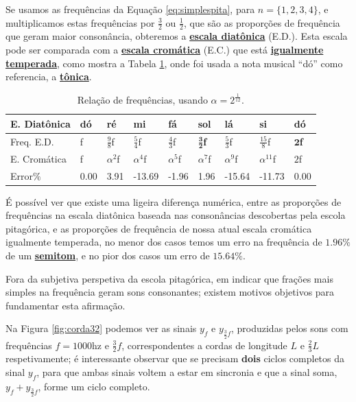Se usamos as frequências da Equação \ref{eq:simplespita}, para $n=\{1,2,3,4\}$,
e multiplicamos estas frequências por $\frac{3}{2}$ ou $\frac{1}{2}$, que
são as proporções de frequência que geram maior consonância,
obteremos a \hyperref[sec:pos:Diatonica]{\textbf{escala diatônica}} (E.D.).
Esta escala pode ser comparada com a \hyperref[sec:pos:Cromatica]{\textbf{escala cromática}} (E.C.)
que está \hyperref[subsec:tempigual]{\textbf{igualmente temperada}}, 
como mostra a Tabela \ref{tab:pitagorascromatica}, onde foi usada a nota musical ``dó'' como referencia, a \hyperref[sec:Tonica]{\textbf{tônica}}.
\begin{table}[h]
  \centering
  \begin{tabular}{|l|l|l|l|l|l|l|l|l|}
  \hline
  E. Diatônica  & dó & ré & mi & fá & sol & lá & si & dó \\ \hline
  \hline
  Freq. E.D.  & f  & $\frac{9}{8}$f & $\frac{5}{4}$f & $\frac{4}{3}$f & $\mathbf{\frac{3}{2}}$\textbf{f} & $\frac{5}{3}$f & $\frac{15}{8}$f & $\mathbf{2}$\textbf{f}\\ \hline
  E. Cromática & f  & $\alpha^{2}$f  & $\alpha^{4}$f  & $\alpha^{5}$f  & $\alpha^{7}$f  & $\alpha^{9}$f  & $\alpha^{11}$f  & $2$f\\ \hline \hline
  Error$\%$ &  0.00 & 3.91 &-13.69 &-1.96 & 1.96 &-15.64&-11.73& 0.00 \\ \hline
  \end{tabular}
  \caption{Relação de frequências, usando $\alpha=2^\frac{1}{12}$.}
  \label{tab:pitagorascromatica}
\end{table}

É possível ver que existe uma ligeira diferença numérica, 
entre as proporções de frequências na escala diatônica baseada nas consonâncias descobertas pela escola pitagórica,
e as proporções de frequência de nossa atual escala cromática igualmente temperada,
no menor dos casos temos um  erro na frequência de $1.96\%$ de um \hyperref[sec:pos:Semitom]{\textbf{semitom}}, 
e no pior dos casos um erro de $15.64\%$.

Fora da subjetiva perspetiva da escola pitagórica, 
em indicar que frações mais simples na frequência geram sons consonantes; 
existem motivos objetivos para fundamentar esta afirmação.

Na Figura \ref{fig:corda32} podemos ver as sinais $y_{f}$ e $y_{\frac{3}{2}f}$, 
produzidas pelos sons com frequências $f=1000$hz e $\frac{3}{2}f$,
correspondentes a cordas de longitude $L$ e $\frac{2}{3}L$ respetivamente;
é interessante observar que se precisam \textbf{dois} ciclos completos da sinal $y_{f}$,
para que ambas sinais voltem a estar em sincronia e que a sinal soma, $y_{f}+y_{\frac{3}{2}f}$, forme um ciclo completo.


